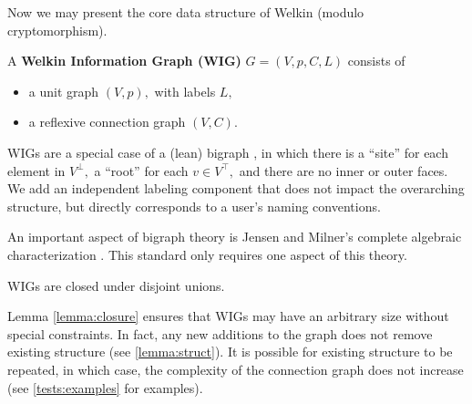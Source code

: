 Now we may present the core data structure of Welkin (modulo cryptomorphism).

\begin{definition} A \textbf{Welkin Information Graph (WIG)} $G = (V, p, C, L)$ consists of
  \begin{itemize}
    \item a unit graph $(V, p),$ with labels $L,$
    \item a reflexive connection graph $(V, C).$
  \end{itemize}
\end{definition}

WIGs are a special case of a (lean) bigraph \cite{jensen-milner-bigraphs}, in which there is a ``site'' for each element in $V^{\bot},$ a ``root'' for each $v \in V^{\top},$ and there are no inner or outer faces. We add an independent labeling component that does not impact the overarching structure, but directly corresponds to a user's naming conventions.


An important aspect of bigraph theory is Jensen and Milner's complete algebraic characterization \cite{jensen-milner-bigraphs}. This standard only requires one aspect of this theory.

\begin{lemma}
WIGs are closed under disjoint unions.
\end{lemma}
\label{lemma:closure}

Lemma \ref{lemma:closure} ensures that WIGs may have an arbitrary size without special constraints. In fact, any new additions to the graph does not remove existing structure (see \ref{lemma:struct}). It is possible for existing structure to be repeated, in which case, the complexity of the connection graph does not increase (see \ref{tests:examples} for examples).





